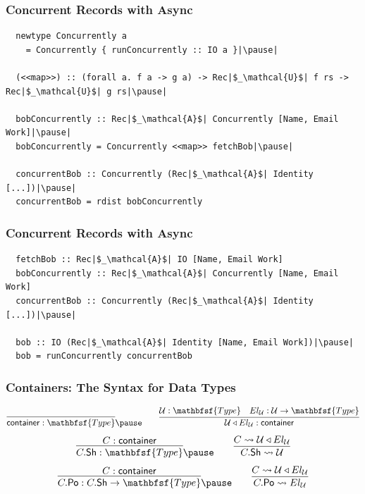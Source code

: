 \documentclass[tikz, 12pt]{beamer}
\def\Type{\mathbfsf{Type}}
\begin{document}
\begin{frame}[fragile]
  \frametitle{Concurrent Records with Async}\pause

  \begin{lstlisting}
  newtype Concurrently a
    = Concurrently { runConcurrently :: IO a }|\pause|

  (<<map>>) :: (forall a. f a -> g a) -> Rec|$_\mathcal{U}$| f rs -> Rec|$_\mathcal{U}$| g rs|\pause|

  bobConcurrently :: Rec|$_\mathcal{A}$| Concurrently [Name, Email Work]|\pause|
  bobConcurrently = Concurrently <<map>> fetchBob|\pause|

  concurrentBob :: Concurrently (Rec|$_\mathcal{A}$| Identity [...])|\pause|
  concurrentBob = rdist bobConcurrently
  \end{lstlisting}
\end{frame}

\begin{frame}[fragile]
  \frametitle{Concurrent Records with Async}\pause

  \begin{lstlisting}
  fetchBob :: Rec|$_\mathcal{A}$| IO [Name, Email Work]
  bobConcurrently :: Rec|$_\mathcal{A}$| Concurrently [Name, Email Work]
  concurrentBob :: Concurrently (Rec|$_\mathcal{A}$| Identity [...])|\pause|

  bob :: IO (Rec|$_\mathcal{A}$| Identity [Name, Email Work])|\pause|
  bob = runConcurrently concurrentBob
  \end{lstlisting}
\end{frame}

\def\container{\mathsf{container}}
\newcommand\mkcon[2]{#1\triangleleft#2}

\begin{frame}
  \frametitle{Containers: The Syntax for Data Types}

  \[
    \infer{\container : \Type}{}\pause
    \qquad
    \infer{\mkcon{\mathcal{U}}{El_\mathcal{U}} : \container}{
      \mathcal{U} : \Type &
      El_\mathcal{U} : \mathcal{U} \to \Type
    }
  \]\pause
  \[
    \infer{C.\mathsf{Sh} : \Type}{C : \container}\pause
    \qquad
    \infer{C.\mathsf{Sh} \leadsto \mathcal{U}}{C \leadsto \mkcon{\mathcal{U}}{El_\mathcal{U}}}
  \]\pause
  \[
    \infer{C.\mathsf{Po} : C.\mathsf{Sh} \to \Type}{C : \container}\pause
    \qquad
    \infer{C.\mathsf{Po} \leadsto El_\mathcal{U}}{C \leadsto \mkcon{\mathcal{U}}{El_\mathcal{U}}}
  \]
\end{frame}
\end{document}
